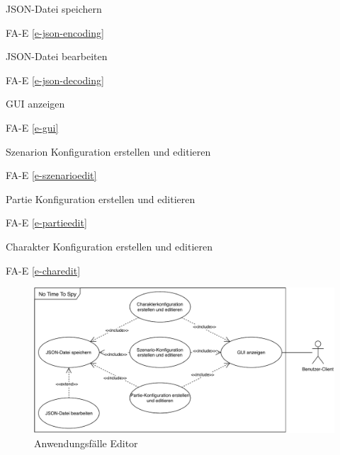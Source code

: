 JSON-Datei speichern

FA-E \ref{e-json-encoding} %

JSON-Datei bearbeiten

FA-E \ref{e-json-decoding} %

GUI anzeigen

FA-E \ref{e-gui} %

Szenarion Konfiguration erstellen und editieren

FA-E \ref{e-szenarioedit} %

Partie Konfiguration erstellen und editieren

FA-E \ref{e-partieedit} %

Charakter Konfiguration erstellen und editieren

FA-E \ref{e-charedit} %

\begin{figure}
  \centering
  \includegraphics[width=\textwidth]{Meilenstein02/use_case_editor.pdf}
  \caption{Anwendungsfälle Editor}
\end{figure}